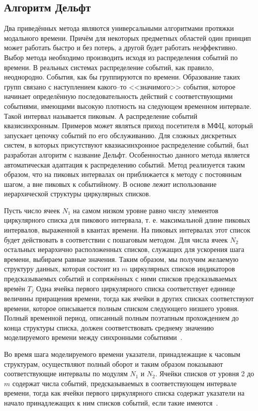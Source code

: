 \subsection{Алгоритм Дельфт}

Два приведённых метода являются универсальными алгоритмами протяжки модального времени. Причём для некоторых предметных областей один принцип может работать быстро и без потерь, а другой будет работать неэффективно. Выбор метода необходимо производить исходя из распределения событий по времени. В реальных системах
распределение событий, как правило, неоднородно. События, как бы группируются по времени. Образование таких групп связано с наступлением какого--то <<значимого>> события, которое начинает определённую последовательность действий с соответствующими событиями, имеющими высокую плотность на следующем временном интервале. Такой интервал называется пиковым. А распределение событий квазисинхронным. Примеров может являться приход посетителя в МФЦ, который запускает цепочку событий по его обслуживанию. Для сложных дискретных систем, в которых присутствуют квазиасинхронное распределение событий, был разработан алгоритм с название Дельфт. Особенностью данного метода является автоматическая адаптация к распределению событий. Метод реализуется таким образом, что на пиковых интервалах он приближается к методу с постоянным шагом, а вне
пиковых к событийному. В основе лежит использование иерархической структуры циркулярных списков. 

Пусть число ячеек  $N_1$ на самом низком уровне равно числу элементов циркулярного списка для пикового  интервала, т. е. максимальной длине пиковых интервалов, выраженной в квантах времени. На пиковых интервалах этот список будет действовать в соответствии с пошаговым  методом. Для числа ячеек  $N_2$ остальных иерархично расположенных списков, служащих для ускорения шага времени, выбираем равные значения. Таким образом, мы получим желаемую структуру данных, которая состоит из $m$ циркулярных списков индикаторов предсказываемых событий и сопряжённых с ними списков предсказываемых времён $T_j$ Одна ячейка первого циркулярного списка соответствует единице величины приращения времени, тогда как ячейки в  других списках соответствуют времени, которое описывается полным списком следующего низшего уровня. Полный временной период, описанный полным поэтапным прохождением до конца структуры списка, должен соответствовать среднему значению моделируемого времени между синхронными событиями~\cite{delft}.

Во время шага  моделируемого времени указатели,  принадлежащие к часовым  структурам, осуществляют полный оборот и таким образом показывают соответствующие интервалы по модулям $N_1$ и $N_2$. Ячейки списков от уровня 2 до $m$ содержат числа событий, предсказываемых в соответствующем интервале  времени, тогда как ячейки первого циркулярного списка содержат указатели на начало принадлежащих к ним списков событий, если такие имеются~\cite{delft}.


